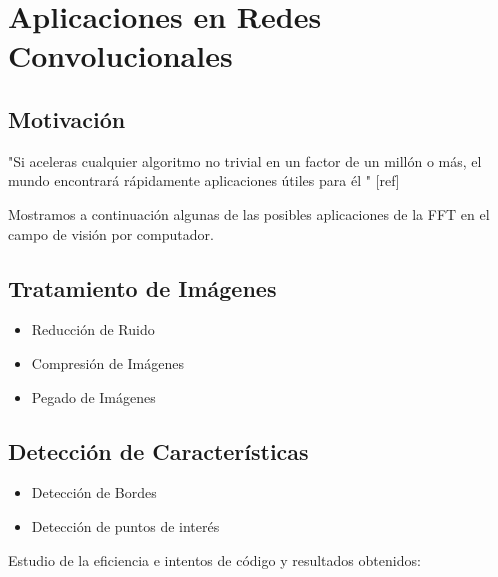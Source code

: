 \chapter{Aplicaciones en Redes Convolucionales}


\section{Motivación}

"Si aceleras cualquier algoritmo no trivial en un factor de un millón o más, el mundo encontrará rápidamente aplicaciones útiles para él " [ref]

\noindent Mostramos a continuación algunas de las posibles aplicaciones de la FFT en el campo de visión por computador.


\section{Tratamiento de Imágenes}

\begin{itemize}
    \item Reducción de Ruido
    \item Compresión de Imágenes
    \item Pegado de Imágenes

\end{itemize}

\section{Detección de Características}
\begin{itemize}
    \item Detección de Bordes
    \item Detección de puntos de interés
\end{itemize}


Estudio de la eficiencia e intentos de código y resultados obtenidos: